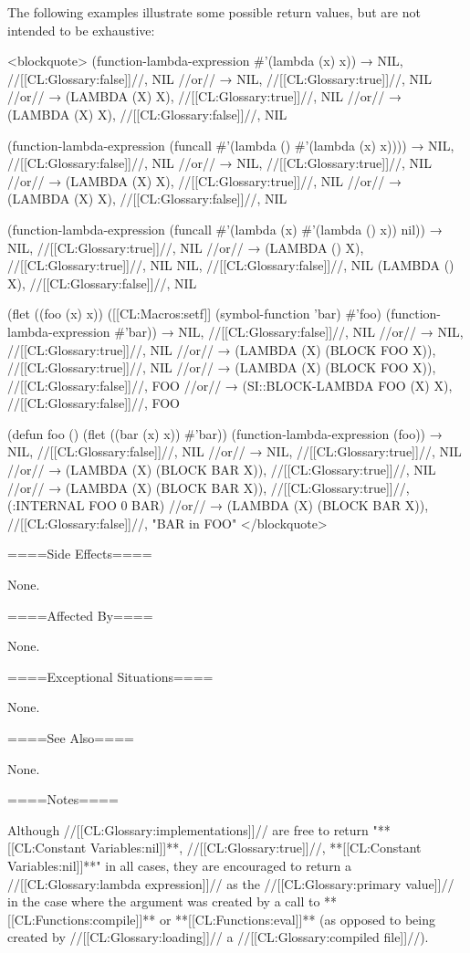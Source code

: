 The following examples illustrate some possible return values, but are not intended to be exhaustive:

<blockquote> (function-lambda-expression #'(lambda (x) x)) → NIL, //[[CL:Glossary:false]]//, NIL //or// → NIL, //[[CL:Glossary:true]]//, NIL //or// → (LAMBDA (X) X), //[[CL:Glossary:true]]//, NIL //or// → (LAMBDA (X) X), //[[CL:Glossary:false]]//, NIL

(function-lambda-expression (funcall #'(lambda () #'(lambda (x) x)))) → NIL, //[[CL:Glossary:false]]//, NIL //or// → NIL, //[[CL:Glossary:true]]//, NIL //or// → (LAMBDA (X) X), //[[CL:Glossary:true]]//, NIL //or// → (LAMBDA (X) X), //[[CL:Glossary:false]]//, NIL

(function-lambda-expression (funcall #'(lambda (x) #'(lambda () x)) nil)) → NIL, //[[CL:Glossary:true]]//, NIL //or// → (LAMBDA () X), //[[CL:Glossary:true]]//, NIL \NV NIL, //[[CL:Glossary:false]]//, NIL \NV (LAMBDA () X), //[[CL:Glossary:false]]//, NIL

(flet ((foo (x) x)) ([[CL:Macros:setf]] (symbol-function 'bar) #'foo) (function-lambda-expression #'bar)) → NIL, //[[CL:Glossary:false]]//, NIL //or// → NIL, //[[CL:Glossary:true]]//, NIL //or// → (LAMBDA (X) (BLOCK FOO X)), //[[CL:Glossary:true]]//, NIL //or// → (LAMBDA (X) (BLOCK FOO X)), //[[CL:Glossary:false]]//, FOO //or// → (SI::BLOCK-LAMBDA FOO (X) X), //[[CL:Glossary:false]]//, FOO

(defun foo () (flet ((bar (x) x)) #'bar)) (function-lambda-expression (foo)) → NIL, //[[CL:Glossary:false]]//, NIL //or// → NIL, //[[CL:Glossary:true]]//, NIL //or// → (LAMBDA (X) (BLOCK BAR X)), //[[CL:Glossary:true]]//, NIL //or// → (LAMBDA (X) (BLOCK BAR X)), //[[CL:Glossary:true]]//, (:INTERNAL FOO 0 BAR) //or// → (LAMBDA (X) (BLOCK BAR X)), //[[CL:Glossary:false]]//, "BAR in FOO" </blockquote>

====Side Effects====

None.

====Affected By====

None.

====Exceptional Situations====

None.

====See Also====

None.

====Notes====

Although //[[CL:Glossary:implementations]]// are free to return "**[[CL:Constant Variables:nil]]**, //[[CL:Glossary:true]]//, **[[CL:Constant Variables:nil]]**" in all cases, they are encouraged to return a //[[CL:Glossary:lambda expression]]// as the //[[CL:Glossary:primary value]]// in the case where the argument was created by a call to **[[CL:Functions:compile]]** or **[[CL:Functions:eval]]** (as opposed to being created by //[[CL:Glossary:loading]]// a //[[CL:Glossary:compiled file]]//).

